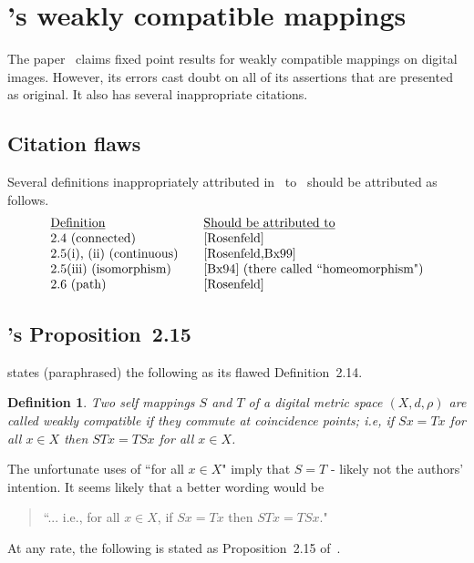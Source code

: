 \documentclass{article}
\newtheorem{definition}[thm]{Definition}
\numberwithin{thm}{section}
\begin{document}
\section{\cite{SalJhade22}'s weakly compatible mappings}
The paper~\cite{SalJhade22} claims fixed point
 results for weakly compatible mappings on digital
images. However, its
errors cast doubt on
all of its assertions
that are presented as
original. It also has
several inappropriate
citations.

\subsection{Citation flaws}
Several definitions inappropriately attributed 
in~\cite{SalJhade22}
to~\cite{EgeKaraca-Ban}
should be attributed as
follows.
\[
\begin{array}{ll}
\underline{\mbox{Definition}} & \underline{\mbox{Should be attributed to}} \\
\mbox{2.4 (connected)} &
\cite{Rosenfeld} \\
\mbox{2.5(i), (ii) (continuous)~~~} &
\cite{Rosenfeld,Bx99} \\
\mbox{2.5(iii) (isomorphism)} &
\mbox{\cite{Bx94} (there called ``homeomorphism")} \\
\mbox{2.6 (path)}
& \cite{Rosenfeld}
\end{array}
\]

\subsection{\cite{SalJhade22}'s Proposition~2.15}
\cite{SalJhade22} states
(paraphrased) the following 
as its flawed
Definition~2.14.

\begin{definition}
    \label{weaklyCompat}
    {\rm \cite{Dalal17}}
    Two self mappings $S$ and $T$
    of a digital metric space
    $(X,d,\rho)$ are called 
    {\em weakly compatible} if they
commute at coincidence points; i.e,
if $Sx = Tx$ for all $x \in X$ 
then $STx = TSx$ for all $x \in X$.
\end{definition}

The unfortunate uses of 
``for all $x \in X$" 
imply that $S=T$ - likely not the authors' intention. 
It seems likely
that a better wording would be 
\begin{quote}
  ``... i.e., for all $x \in X$, if $Sx = Tx$  
then $STx = TSx$."  
\end{quote}

At any rate, the following is
stated as Proposition~2.15
of~\cite{SalJhade22}.
\end{document}
